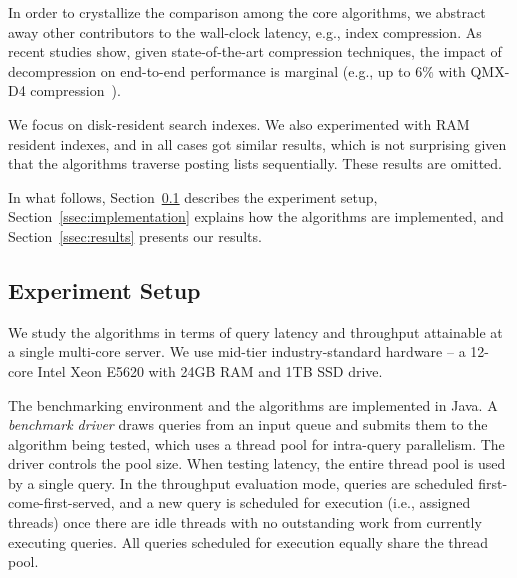 {
In order to crystallize the comparison among  the core algorithms, 
we abstract away other contributors to the wall-clock  latency, e.g., index compression. 
As recent studies show, given state-of-the-art compression techniques, the impact 
of decompression on end-to-end performance is marginal (e.g., up to $6\%$ with QMX-D4 compression~\cite{Lin:2017}).  

We focus on disk-resident search indexes. 
We also experimented with RAM resident indexes, and in all cases \pRA got similar results, which is not surprising given that the algorithms traverse posting lists sequentially. These results are omitted.

In what follows, Section~\ref{ssec:setup} describes the experiment setup, 
Section~\ref{ssec:implementation} explains how the algorithms are 
implemented, and Section~\ref{ssec:results} presents our results.


\subsection{Experiment Setup}
\label{ssec:setup}

We study the algorithms in terms of query latency and throughput attainable at a single multi-core server. 
We use mid-tier industry-standard hardware -- a 12-core Intel Xeon E5620 with 24GB RAM and 1TB SSD drive. 

The benchmarking environment and the algorithms  are implemented in Java. 
A  \emph{benchmark driver} draws queries from an input queue and submits them to the algorithm being tested, which
uses a thread pool for intra-query parallelism. 
The driver controls the pool size. %
When testing latency, the entire thread pool is used by a single query. 
In the throughput evaluation mode, queries are scheduled first-come-first-served, 
and a new query is scheduled for execution (i.e., assigned threads) 
once  there are idle threads with no outstanding work from currently executing queries.
All queries scheduled for execution equally share the thread pool.

}
